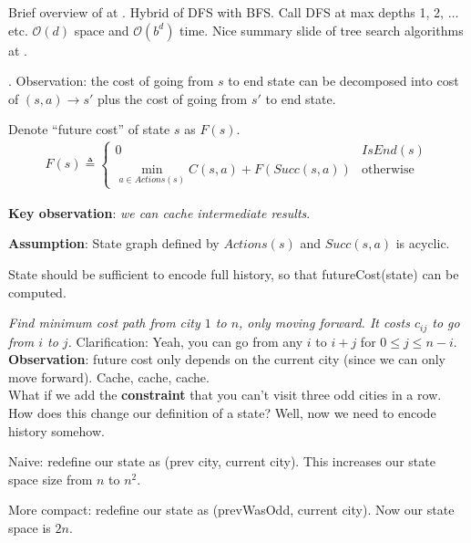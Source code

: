 \documentclass[11pt]{article}
\newcommand\myspace[1][]{\vspace{#1\bigskipamount}\Needspace{10\baselineskip}}
\newcommand\p{\Needspace{10\baselineskip} \noindent}
\begin{document}
Brief overview of  at . Hybrid of DFS with BFS. Call DFS at max depths 1, 2, $\ldots$ etc. $\mathcal O(d)$ space and $\mathcal O(b^d)$ time. Nice summary slide of tree search algorithms at . 

\myspace 
\p {} . Observation: the cost of going from $s$ to end state can be decomposed into cost of $(s, a) \rightarrow s'$ plus the cost of going from $s'$ to end state.
\begin{compactitem}
	\item Denote ``future cost'' of state $s$ as $F(s)$. 
	\begin{align}
		F(s) \triangleq 
		\begin{cases}
			0 & IsEnd(s) \\
			\min_{a \in Actions(s)} C(s, a) + F(Succ(s, a)) & \text{otherwise} 
		\end{cases}
	\end{align}
	
	\item \textbf{Key observation}: \textit{we can cache intermediate results}. 
	
	\item \textbf{Assumption}: State graph defined by $Actions(s)$ and $Succ(s, a)$ is acyclic. 
	
	\item State should be sufficient to encode full history, so that futureCost(state) can be computed. 
\end{compactitem}

\myspace{}
\begin{example}
	\textit{Find minimum cost path from city $1$ to $n$, only moving forward. It costs $c_{ij}$ to go from $i$ to $j$.}
	\tcblower 
	Clarification: Yeah, you can go from any $i$ to $i + j$ for $0 \le j \le n - i$. 
	\textbf{Observation}: future cost only depends on the current city (since we can only move forward). Cache, cache, cache.\\
	
	What if we add the \textbf{constraint} that you can't visit three odd cities in a row. How does this change our definition of a state? Well, now we need to encode history somehow. 
	\begin{compactitem}
	\item Naive: redefine our state as (prev city, current city). This increases our state space size from $n$ to $n^2$. 
	
	\item More compact: redefine our state as (prevWasOdd, current city). Now our state space is $2n$. 
	\end{compactitem}
\end{example}
\end{document}
